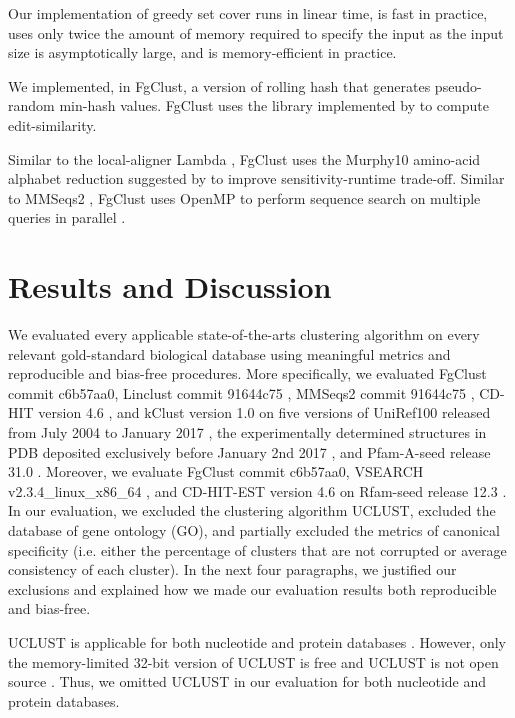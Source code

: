 \documentclass[11pt,letterpaper]{article}
\begin{document}
Our implementation of greedy set cover runs in linear time, is fast in practice, uses only twice the amount of memory required to specify the input as the input size is asymptotically large, and is memory-efficient in practice.

We implemented, in FgClust, a version of rolling hash that generates pseudo-random min-hash values.
FgClust uses the library implemented by \citet{vsovsic2017edlib} to compute edit-similarity.

Similar to the local-aligner Lambda \citep{hauswedell2014lambda}, FgClust uses the Murphy10 amino-acid alphabet reduction suggested by \citet{murphy2000simplified} to improve sensitivity-runtime trade-off.
Similar to MMSeqs2 \citep{steinegger2017mmseqs2}, FgClust uses OpenMP to perform sequence search on multiple queries in parallel \citep{dagum1998openmp}.

\section{Results and Discussion}

We evaluated every applicable state-of-the-arts clustering algorithm on every relevant gold-standard biological database using meaningful metrics and reproducible and bias-free procedures.
More specifically,
we evaluated FgClust commit c6b57aa0, 
Linclust commit 91644c75 \citep{steinegger2017linclust}, 
MMSeqs2 commit 91644c75 \citep{steinegger2017mmseqs2}, 
CD-HIT version 4.6 \citep{fu2012cd},
and kClust version 1.0 \citep{hauser2013kclust} on
five versions of UniRef100 released from July 2004 to January 2017 \citep{suzek2014uniref},
the experimentally determined structures in PDB deposited exclusively before January 2nd 2017 \citep{berman2006protein},
and Pfam-A-seed release 31.0 \cite{finn2016pfam}.
Moreover, we evaluate FgClust commit c6b57aa0, VSEARCH v2.3.4\_linux\_x86\_64 \citep{rognes2016vsearch}, and CD-HIT-EST version 4.6 \citep{fu2012cd} on Rfam-seed release 12.3 \citep{nawrocki2014rfam}.
In our evaluation, we excluded the clustering algorithm UCLUST, excluded the database of gene ontology (GO), and partially excluded the metrics of canonical  specificity (i.e. either the percentage of clusters that are not corrupted or average consistency of each cluster).
In the next four paragraphs, we justified our exclusions and explained how we made our evaluation results both reproducible and bias-free.

UCLUST is applicable for both nucleotide and protein databases \citep{edgar2010search}.
However, only the memory-limited 32-bit version of UCLUST is free and UCLUST is not open source \citep{edgar2010search}.
Thus, we omitted UCLUST in our evaluation for both nucleotide and protein databases.
\end{document}
